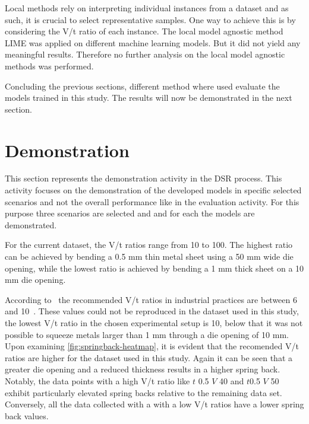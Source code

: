 Local methods rely on interpreting individual instances from a dataset and as such, it is
crucial to select representative samples.
One way to achieve this is by considering the V/t ratio of each instance.
The local model agnostic method LIME was applied on different machine learning models.
But it did not yield any meaningful results.
Therefore no further analysis on the local model agnostic methods was performed.

Concluding the previous sections, different method where used evaluate the models trained in this study.
The results will now be demonstrated in the next section.


\section{Demonstration}\label{sec:demonstration}
This section represents the demonstration activity in the \ac{DSR} process.
This activity focuses on the demonstration of the developed models in specific selected scenarios and not the
overall performance like in the evaluation activity.
For this purpose three scenarios are selected and and for each the models are demonstrated.

For the current dataset, the V/t ratios range from 10 to 100.
The highest ratio can be achieved by bending a 0.5 mm thin metal sheet using a 50 mm wide die opening, while the
lowest ratio is achieved by bending a 1 mm thick sheet on a 10 mm die opening.

According to~\cite{cruz2021application} the recommended V/t ratios in industrial practices are between 6 and
10~\cite[p. 7]{cruz2021application}.
These values could not be reproduced in the dataset used in this study, the lowest V/t ratio in the chosen experimental
setup is 10, below that it was not possible to squeeze metals larger than 1 mm through a die opening of 10 mm.
Upon examining \cref{fig:springback-heatmap}, it is evident that the recomended V/t ratios are higher for the
dataset used in this study.
Again it can be seen that a greater die opening and a reduced thickness results in a higher spring back.
Notably, the data points with a high V/t ratio like $t$ 0.5 $V$ 40 and $t$0.5 $V$ 50 exhibit particularly elevated
spring
backs relative to the remaining data set.
Conversely, all the data collected with a with a low V/t ratios have a lower spring back values.

